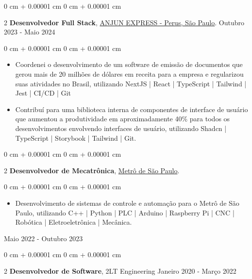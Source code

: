 \documentclass[10pt, letterpaper]{article}
\newenvironment{highlights}{ \begin{itemize}[ topsep=0.10 cm, parsep=0.10 cm, partopsep=0pt,
itemsep=0pt, leftmargin=0 cm + 10pt ] }{ \end{itemize} } %
\newenvironment{onecolentry}{ \begin{adjustwidth}{ 0 cm + 0.00001 cm }{ 0 cm + 0.00001 cm }
}{ \end{adjustwidth} } %
\newenvironment{twocolentry}[2][]{ \onecolentry \def\secondColumn{#2} \setcolumnwidth{\fill, 4.5 cm}
\begin{paracol}{2} }{ \switchcolumn \raggedleft \secondColumn \end{paracol}
\endonecolentry } %
\let\hrefWithoutArrow\href
\begin{document}
    \vspace{0.2 cm}
    
    \begin{twocolentry}
        { Outubro 2023 - Maio 2024 } \textbf{Desenvolvedor Full Stack}, {\hrefWithoutArrow{https://anjunexpress.com.br/}{ANJUN EXPRESS - Perus, São Paulo}}.
    \end{twocolentry}
    
    \vspace{0.10 cm}
    \begin{onecolentry}
        \begin{highlights}
            \item Coordenei o desenvolvimento de um software de emissão de documentos que gerou mais de 20 milhões de dólares em receita para a empresa e regularizou suas atividades no Brasil, utilizando NextJS | React | TypeScript | Tailwind | Jest | CI/CD | Git
            \item Contribuí para uma biblioteca interna de componentes de interface de usuário que aumentou a produtividade em aproximadamente 40\% para todos os desenvolvimentos envolvendo interfaces de usuário, utilizando Shadcn | TypeScript | Storybook | Tailwind | Git.
        \end{highlights}
    \end{onecolentry}
    
    \vspace{0.2 cm}
    
    \begin{twocolentry}
        { Maio 2022 - Outubro 2023 } \textbf{Desenvolvedor de Mecatrônica}, {\hrefWithoutArrow{https://anjunexpress.com.br/}{Metrô de São Paulo}}.
        \vspace{0.10 cm}
    \begin{onecolentry}
        \begin{highlights}
           \item Desenvolvimento de sistemas de controle e automação para o Metrô de São Paulo, utilizando C++ | Python | PLC | Arduino | Raspberry Pi | CNC | Robótica | Eletroeletrônica | Mecânica.
           
        \end{highlights}
    \end{onecolentry}
    \end{twocolentry}
    
    \begin{twocolentry}
        { Janeiro 2020 - Março 2022 } \textbf{Desenvolvedor de Software}, 2LT Engineering
    \end{twocolentry}
    
\end{document}
